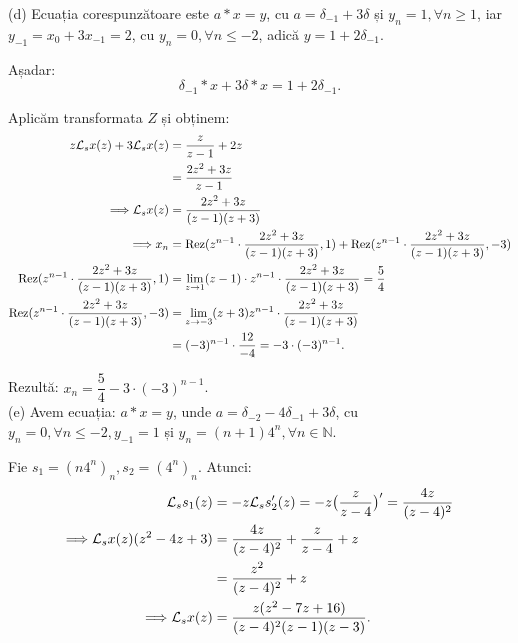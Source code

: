 (d) Ecuația corespunzătoare este $a \ast x = y$, cu $a = \delta_{-1} + 3 \delta$ și 
$y_n = 1, \forall n \geq 1$, iar $y_{-1} = x_0 + 3 x_{-1} = 2$, cu 
$y_n = 0, \forall n \leq -2$, adică $y = 1 + 2 \delta_{-1}$.

Așadar: 
\[
  \delta_{-1} \ast x + 3 \delta \ast x = 1 + 2 \delta_{-1}.
\]

Aplicăm transformata $Z$ și obținem:
\begin{align*}
  z \mathcal{L}_s x(z) + 3 \mathcal{L}_s x(z) &= \dfrac{z}{z-1} + 2z \\
                                &= \dfrac{2z^2 + 3z}{z-1} \\
  \Longrightarrow \mathcal{L}_s x(z) &= \dfrac{2z^2 + 3z}{(z-1)(z+3)} \\
  \Longrightarrow x_n &= \mathrm{Rez}(z^{n-1} \cdot \dfrac{2z^2 + 3z}{(z-1)(z+3)}, 1) + 
                        \mathrm{Rez} (z^{n-1} \cdot \dfrac{2z^2 + 3z}{(z-1)(z+3)}, -3) \\
  \mathrm{Rez}(z^{n-1} \cdot \dfrac{2z^2 + 3z}{(z-1)(z+3)}, 1) &= \lim_{z \to 1} (z-1) 
                                                         \cdot z^{n-1} \cdot \dfrac{2z^2 + 3z}{(z-1)(z+3)} = \dfrac{5}{4} \\
  \mathrm{Rez}(z^{n-1} \cdot \dfrac{2z^2 + 3z}{(z-1)(z+3)}, -3) 
                                &= \lim_{z \to -3} (z+3) z^{n-1} \cdot \dfrac{2z^2 + 3z}{(z-1)(z+3)} \\
                                &= (-3)^{n-1} \cdot \dfrac{12}{-4} = -3 \cdot (-3)^{n-1}.	                              
\end{align*}

Rezultă: $x_n = \dfrac{5}{4} - 3 \cdot (-3)^{n-1}$. \\

(e) Avem ecuația: $a \ast x = y$, unde 
$a = \delta_{-2} - 4 \delta_{-1} + 3 \delta$, cu 
$y_n = 0, \forall n \leq -2, y_{-1} = 1$ și 
$y_n = (n+1)4^n, \forall n \in \mathbb{N}$.

Fie $s_1 = (n4^n)_n, s_2 = (4^n)_n$. Atunci:
\begin{align*}
  \mathcal{L}_s s_1(z) &= -z \mathcal{L}_s s_2^{\prime}(z) 
                  = - z \big( \dfrac{z}{z-4} \big)^{\prime} = \dfrac{4z}{(z-4)^2} \\
  \Longrightarrow \mathcal{L}_s x(z)(z^2 - 4z + 3) 
                &= \dfrac{4z}{(z-4)^2} + \dfrac{z}{z-4} + z \\
                &= \dfrac{z^2}{(z-4)^2} + z \\
  \Longrightarrow  \mathcal{L}_s x(z) &= \dfrac{z(z^2 - 7z + 16)}{(z-4)^2 (z-1) (z-3)}.
\end{align*}

